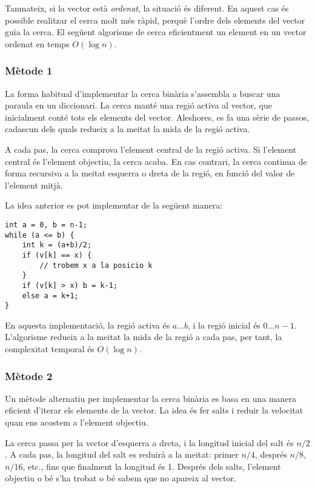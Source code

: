 Tanmateix, si la vector està \emph{ordenat},
la situació és diferent.
En aquest cas és possible realitzar el
cerca molt més ràpid, perquè l'ordre dels
elements del vector guia la cerca.
El següent algorisme de 
cerca eficientment un element en un vector ordenat
en temps $O(\log n)$.

\subsubsection{Mètode 1}

La forma habitual d'implementar la cerca binària
s'assembla a buscar una paraula en un diccionari.
La cerca manté una regió activa al vector,
que inicialment conté tots els elements del vector.
Aleshores, es fa una sèrie de passos,
cadascun dels quals redueix a la meitat la mida de la regió
activa.

A cada pas, la cerca comprova l'element central
de la regió activa.
Si l'element central és l'element objectiu,
la cerca acaba.
En cas contrari, la cerca continua de forma recursiva
a la meitat esquerra o dreta de la regió,
en funció del valor de l'element mitjà.

La idea anterior es pot implementar de la següent manera:
\begin{lstlisting}
int a = 0, b = n-1;
while (a <= b) {
    int k = (a+b)/2;
    if (v[k] == x) {
        // trobem x a la posicio k
    }
    if (v[k] > x) b = k-1;
    else a = k+1;
}
\end{lstlisting}

En aquesta implementació, la regió activa és $a \ldots b$,
i la regió inicial és $0 \ldots n-1$.
L'algorisme redueix a la meitat la mida de la regió a cada pas,
per tant, la complexitat temporal és $O(\log n)$.

\subsubsection{Mètode 2}

Un mètode alternatiu per implementar la cerca binària
es basa en una manera eficient d'iterar
els elements de la vector.
La idea és fer salts i reduir la velocitat
quan ens acostem a l'element objectiu.

La cerca passa per la vector d'esquerra a
dreta, i la longitud inicial del salt és $n/2$.
A cada pas, la longitud del salt es reduirà a la meitat:
primer $n/4$, després $n/8$, $n/16$, etc., fins que
finalment la longitud és 1.
Després dels salts, l'element objectiu o bé
s'ha trobat o bé sabem que no apareix al vector.

